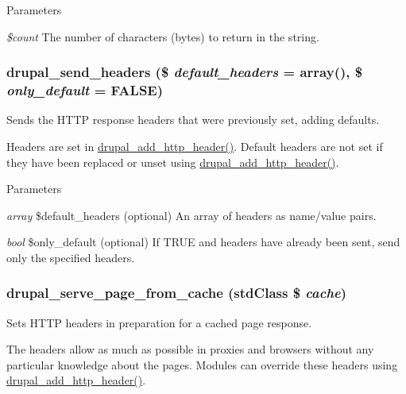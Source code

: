 \begin{DoxyParams}{Parameters}
\item[{\em \$count}]The number of characters (bytes) to return in the string. \end{DoxyParams}
\hypertarget{bootstrap_8inc_a903274a2d3421ae33eaa053b36ac9855}{
\subsubsection[{drupal\_\-send\_\-headers}]{\setlength{\rightskip}{0pt plus 5cm}drupal\_\-send\_\-headers (\$ {\em default\_\-headers} = {\ttfamily array()}, \/  \$ {\em only\_\-default} = {\ttfamily FALSE})}}
\label{bootstrap_8inc_a903274a2d3421ae33eaa053b36ac9855}
Sends the HTTP response headers that were previously set, adding defaults.

Headers are set in \hyperlink{bootstrap_8inc_ad4ff2b2cf5a2fb632c2c869bc1a5a70f}{drupal\_\-add\_\-http\_\-header()}. Default headers are not set if they have been replaced or unset using \hyperlink{bootstrap_8inc_ad4ff2b2cf5a2fb632c2c869bc1a5a70f}{drupal\_\-add\_\-http\_\-header()}.


\begin{DoxyParams}{Parameters}
\item[{\em array}]\$default\_\-headers (optional) An array of headers as name/value pairs. \item[{\em bool}]\$only\_\-default (optional) If TRUE and headers have already been sent, send only the specified headers. \end{DoxyParams}
\hypertarget{bootstrap_8inc_ae09cf8051ec110fd6ce67f4a3b77a3fb}{
\subsubsection[{drupal\_\-serve\_\-page\_\-from\_\-cache}]{\setlength{\rightskip}{0pt plus 5cm}drupal\_\-serve\_\-page\_\-from\_\-cache (stdClass \$ {\em cache})}}
\label{bootstrap_8inc_ae09cf8051ec110fd6ce67f4a3b77a3fb}
Sets HTTP headers in preparation for a cached page response.

The headers allow as much as possible in proxies and browsers without any particular knowledge about the pages. Modules can override these headers using \hyperlink{bootstrap_8inc_ad4ff2b2cf5a2fb632c2c869bc1a5a70f}{drupal\_\-add\_\-http\_\-header()}.

